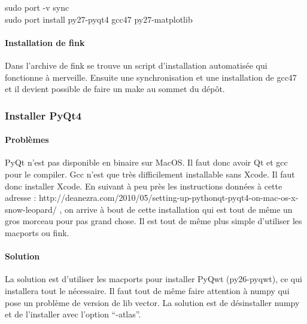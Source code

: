 \documentclass[12pt,a4paper]{article}
\begin{document}

        sudo port -v sync\\

        sudo port install py27-pyqt4 gcc47 py27-matplotlib

        \paragraph{Installation de fink}
        Dans l'archive de fink se trouve un script d'installation automatisée qui
        fonctionne à merveille. Ensuite une synchronisation et une installation de
        gcc47 et il devient possible de faire un make au sommet du dépôt.

        \subsubsection{Installer PyQt4}

        \paragraph{Problèmes}

        PyQt n'est pas disponible en binaire sur MacOS. Il faut donc avoir Qt et
        gcc pour le compiler.  Gcc n'est que très difficilement installable sans
        Xcode. Il faut donc installer Xcode.  En suivant à peu près les
        instructions données à cette adresse : \newline
        http://deanezra.com/2010/05/setting-up-pythonqt-pyqt4-on-mac-os-x-snow-leopard/\newline
        , on arrive à bout de cette installation qui est tout de même un gros
        morceau pour pas grand chose. Il est tout de même plus simple d'utiliser
        les macports ou fink.\\
    
        \paragraph{Solution}

        La solution est d'utiliser les macports pour installer PyQwt
        (py26-pyqwt), ce qui installera tout le n\'ecessaire. Il faut tout de
        même faire attention à numpy qui pose un problème de version de lib
        vector. La solution est de d\'esinstaller numpy et de l'installer avec
        l'option ``-atlas''. 
\end{document}
